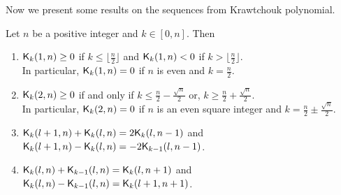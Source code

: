 \documentclass{llncs}
\begin{document}
Now we present some results on the sequences from Krawtchouk polynomial.
\begin{lemma}\label{lem:KProp}
Let $n$ be a positive integer and $k \in [0,n]$. Then
\begin{enumerate}
\item\label{itm:l1} $\mathsf{K}_{k}(1,n) \geq 0$ if $k \leq \lfloor\frac{n}{2}\rfloor$ and $\mathsf{K}_{k}(1,n) < 0$ if $k > \lfloor\frac{n}{2}\rfloor$.\\
In particular, $\mathsf{K}_{k}(1,n) = 0$ if $n$ is even and $k = \frac{n}{2}$.
\item \label{itm:l2} $\mathsf{K}_{k}(2,n) \geq 0$ if and only if $k \leq \frac{n}{2} - \frac{\sqrt{n}}{2}$ or, $k \geq \frac{n}{2} + \frac{\sqrt{n}}{2}$.\\
In particular, $\mathsf{K}_{k}(2,n) = 0$ if $n$ is an even square integer and $k = \frac{n}{2} \pm \frac{\sqrt{n}}{2}$.
\item\label{itm:ksd} $\mathsf{K}_{k}(l+1,n) + \mathsf{K}_{k}(l,n) = 2\mathsf{K}_{k}(l,n-1)$
and $\mathsf{K}_{k}(l+1,n) - \mathsf{K}_{k}(l,n) = -2\mathsf{K}_{k-1}(l,n-1)$.
\item \label{itm:ksd2} $\mathsf{K}_{k}(l,n) + \mathsf{K}_{k-1}(l,n) = \mathsf{K}_{k}(l,n+1)$ and $\mathsf{K}_{k}(l,n) - \mathsf{K}_{k-1}(l,n) = \mathsf{K}_{k}(l+1,n+1)$.
\end{enumerate}
\end{lemma}
\end{document}
